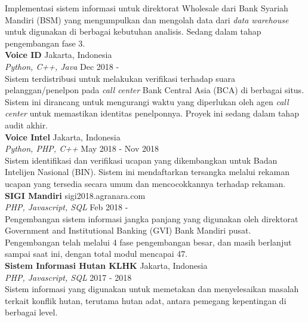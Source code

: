 \documentclass[a4paper]{article}
\begin{document}
Implementasi sistem informasi untuk direktorat Wholesale dari Bank Syariah
Mandiri (BSM) yang mengumpulkan dan mengolah data dari \textit{data warehouse}
untuk digunakan di berbagai kebutuhan analisis. Sedang dalam tahap pengembangan
fase 3. \\
\vspace*{3mm}
{\textbf{Voice ID}} \hfill Jakarta, Indonesia \\
{\sl Python, C++, Java} \hfill Dec 2018 - \\
\vspace*{1mm}
Sistem terdistribusi untuk melakukan verifikasi terhadap suara
pelanggan/penelpon pada \textit{call center} Bank Central Asia (BCA) di berbagai
situs. Sistem ini dirancang untuk mengurangi waktu yang diperlukan oleh agen
\textit{call center} untuk memastikan identitas penelponnya. Proyek ini sedang
dalam tahap audit akhir.\\
\vspace*{3mm}
{\textbf{Voice Intel}} \hfill Jakarta, Indonesia \\
{\sl Python, PHP, C++} \hfill May 2018 - Nov 2018 \\
\vspace*{1mm}
Sistem identifikasi dan verifikasi ucapan yang dikembangkan untuk Badan
Intelijen Nasional (BIN). Sistem ini mendaftarkan tersangka melalui rekaman
ucapan yang tersedia secara umum dan mencocokkannya terhadap rekaman. \\
\vspace*{3mm}
{\textbf{SIGI Mandiri}}  \hfill sigi2018.agranara.com\\
{\sl PHP, Javascript, SQL} \hfill Feb 2018 - \\
\vspace*{1mm}
Pengembangan sistem informasi jangka panjang yang digunakan oleh direktorat
Government and Institutional Banking (GVI) Bank Mandiri pusat. Pengembangan
telah melalui 4 fase pengembangan besar, dan masih berlanjut sampai saat ini,
dengan total modul mencapai 47. \\
\vspace*{3mm}
{\textbf{Sistem Informasi Hutan KLHK}}  \hfill Jakarta, Indonesia\\
{\sl PHP, Javascript, SQL} \hfill 2017 - 2018\\
\vspace*{1mm}
Sistem informasi yang digunakan untuk memetakan dan menyelesaikan masalah
terkait konflik hutan, terutama hutan adat, antara pemegang kepentingan di
berbagai level. \\
\vspace*{3mm}
\end{document}
